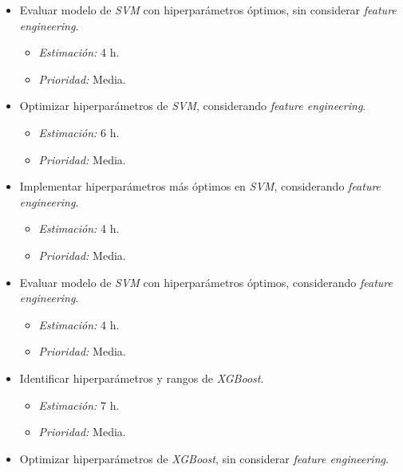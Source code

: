 \documentclass[
11pt, %
]{charter}
\begin{document}
\begin{itemize}
\begin{itemize}
\begin{itemize}
                \end{itemize}
            \item Evaluar modelo de \textit{SVM} con hiperparámetros óptimos, sin considerar \textit{feature engineering}.
                \begin{itemize}
                    \item \textit{Estimación:} 4 h.
                    \item \textit{Prioridad:} Media.
                \end{itemize}
            \item Optimizar hiperparámetros de \textit{SVM}, considerando \textit{feature engineering}.
                \begin{itemize}
                    \item \textit{Estimación:} 6 h.
                    \item \textit{Prioridad:} Media.
                \end{itemize}
            \item Implementar hiperparámetros más óptimos en \textit{SVM}, considerando \textit{feature engineering}.
                \begin{itemize}
                    \item \textit{Estimación:} 4 h.
                    \item \textit{Prioridad:} Media.
                \end{itemize}
            \item Evaluar modelo de \textit{SVM} con hiperparámetros óptimos, considerando \textit{feature engineering}.
                \begin{itemize}
                    \item \textit{Estimación:} 4 h.
                    \item \textit{Prioridad:} Media.
                \end{itemize}           
            \item Identificar hiperparámetros y rangos de \textit{XGBoost}.
                \begin{itemize}
                    \item \textit{Estimación:} 7 h.
                    \item \textit{Prioridad:} Media.
                \end{itemize}
            \item Optimizar hiperparámetros de \textit{XGBoost}, sin considerar \textit{feature engineering}.

\end{itemize}
\end{itemize}
\end{document}
